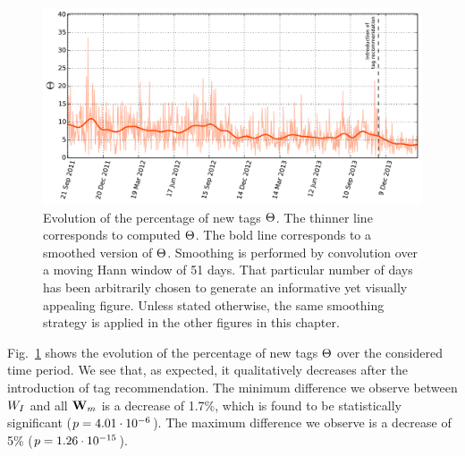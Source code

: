 \begin{figure}
\centerline{\includegraphics[width=\figSizeMax]{ch05_impact/pics/fig05_percentage_new_tags}}
\caption[Evolution of the percentage of new tags]{Evolution of the percentage of new tags $\Theta$. The thinner line corresponds to computed $\Theta$. The bold line corresponds to a smoothed version of $\Theta$. Smoothing is performed by convolution over a moving Hann window of 51 days. That particular number of days has been arbitrarily chosen to generate an informative yet visually appealing figure. Unless stated otherwise, the same smoothing strategy is applied in the other figures in this chapter.} 
\label{impact:fig:percentage_new_tags}
\end{figure}

Fig.~\ref{impact:fig:percentage_new_tags} shows the evolution of the percentage of new tags $\Theta$ over the considered time period. We see that, as expected, it qualitatively decreases after the introduction of tag recommendation. The minimum difference we observe between $W_I$ and all $\mathbf{W}_m$ is a decrease of 1.7\%, which is found to be statistically significant ($p = 4.01\cdot 10^{-6}$). The maximum difference we observe is a decrease of 5\% ($p = 1.26 \cdot 10^{-15}$). 

